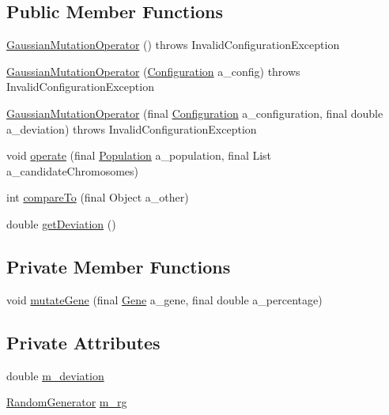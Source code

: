 \subsection*{Public Member Functions}
\begin{DoxyCompactItemize}
\item 
\hyperlink{classorg_1_1jgap_1_1impl_1_1_gaussian_mutation_operator_a1387ca01dd329887f37c4a7533f0d83c}{Gaussian\-Mutation\-Operator} ()  throws Invalid\-Configuration\-Exception 
\item 
\hyperlink{classorg_1_1jgap_1_1impl_1_1_gaussian_mutation_operator_a542fbeeb659fbd8ff614ff68dd7f2fc6}{Gaussian\-Mutation\-Operator} (\hyperlink{classorg_1_1jgap_1_1_configuration}{Configuration} a\-\_\-config)  throws Invalid\-Configuration\-Exception 
\item 
\hyperlink{classorg_1_1jgap_1_1impl_1_1_gaussian_mutation_operator_a1e9d9ca44977b1aa08e6b7a385a730ad}{Gaussian\-Mutation\-Operator} (final \hyperlink{classorg_1_1jgap_1_1_configuration}{Configuration} a\-\_\-configuration, final double a\-\_\-deviation)  throws Invalid\-Configuration\-Exception 
\item 
void \hyperlink{classorg_1_1jgap_1_1impl_1_1_gaussian_mutation_operator_aa33da8cc4da351383f79ddaae90e988a}{operate} (final \hyperlink{classorg_1_1jgap_1_1_population}{Population} a\-\_\-population, final List a\-\_\-candidate\-Chromosomes)
\item 
int \hyperlink{classorg_1_1jgap_1_1impl_1_1_gaussian_mutation_operator_a3c910d5358450dd8a22118e4b5c31d1d}{compare\-To} (final Object a\-\_\-other)
\item 
double \hyperlink{classorg_1_1jgap_1_1impl_1_1_gaussian_mutation_operator_a41ffe4e1c827b8f26da750f31a46669d}{get\-Deviation} ()
\end{DoxyCompactItemize}
\subsection*{Private Member Functions}
\begin{DoxyCompactItemize}
\item 
void \hyperlink{classorg_1_1jgap_1_1impl_1_1_gaussian_mutation_operator_a11e112e00b6ad792cca9c980de3198a6}{mutate\-Gene} (final \hyperlink{interfaceorg_1_1jgap_1_1_gene}{Gene} a\-\_\-gene, final double a\-\_\-percentage)
\end{DoxyCompactItemize}
\subsection*{Private Attributes}
\begin{DoxyCompactItemize}
\item 
double \hyperlink{classorg_1_1jgap_1_1impl_1_1_gaussian_mutation_operator_a4278e98a678979f59d6c0f9242d2da33}{m\-\_\-deviation}
\item 
\hyperlink{interfaceorg_1_1jgap_1_1_random_generator}{Random\-Generator} \hyperlink{classorg_1_1jgap_1_1impl_1_1_gaussian_mutation_operator_a8f6f5c01260bae127da24ca8231ac158}{m\-\_\-rg}
\end{DoxyCompactItemize}

